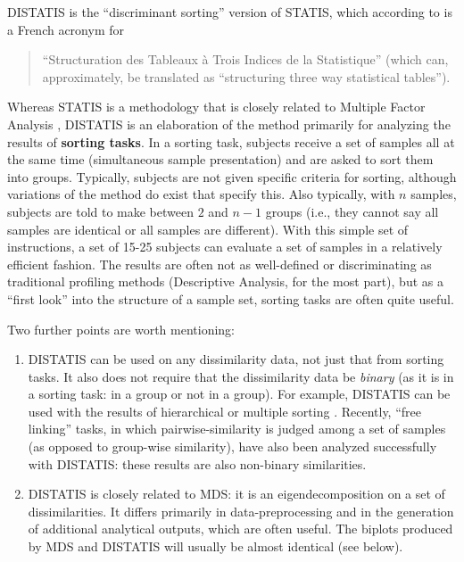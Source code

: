 \documentclass[
]{book}
\providecommand{\tightlist}{%
  \setlength{\itemsep}{0pt}\setlength{\parskip}{0pt}}
\begin{document}
DISTATIS is the ``discriminant sorting'' version of STATIS, which according to \citet[p.125]{abdiSTATIS2012} is a French acronym for

\begin{quote}
``Structuration des Tableaux à Trois Indices de la Statistique'' (which can, approximately, be translated as ``structuring three way statistical tables'').
\end{quote}

Whereas STATIS is a methodology that is closely related to Multiple Factor Analysis \citep[MFA:][]{abdiMultiple2013}, DISTATIS is an elaboration of the method primarily for analyzing the results of \textbf{sorting tasks}. In a sorting task, subjects receive a set of samples all at the same time (simultaneous sample presentation) and are asked to sort them into groups. Typically, subjects are not given specific criteria for sorting, although variations of the method do exist that specify this. Also typically, with \(n\) samples, subjects are told to make between \(2\) and \(n-1\) groups (i.e., they cannot say all samples are identical or all samples are different). With this simple set of instructions, a set of 15-25 subjects can evaluate a set of samples in a relatively efficient fashion. The results are often not as well-defined or discriminating as traditional profiling methods (Descriptive Analysis, for the most part), but as a ``first look'' into the structure of a sample set, sorting tasks are often quite useful.

Two further points are worth mentioning:

\begin{enumerate}
\def\labelenumi{\arabic{enumi}.}
\tightlist
\item
  DISTATIS can be used on any dissimilarity data, not just that from sorting tasks. It also does not require that the dissimilarity data be \emph{binary} (as it is in a sorting task: in a group or not in a group). For example, DISTATIS can be used with the results of hierarchical or multiple sorting \citep{courcouxFree2023}. Recently, ``free linking'' tasks, in which pairwise-similarity is judged among a set of samples (as opposed to group-wise similarity), have also been analyzed successfully with DISTATIS: these results are also non-binary similarities.
\item
  DISTATIS is closely related to MDS: it is an eigendecomposition on a set of dissimilarities. It differs primarily in data-preprocessing and in the generation of additional analytical outputs, which are often useful. The biplots produced by MDS and DISTATIS will usually be almost identical (see below).
\end{enumerate}
\end{document}
